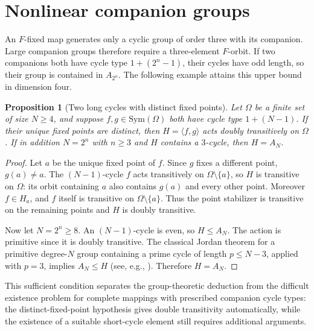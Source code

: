 \documentclass[11pt]{article}
\newtheorem{proposition}[theorem]{Proposition}
\begin{document}
\section{Nonlinear companion groups}\label{sec:nonlinear}
An $F$-fixed map generates only a cyclic group of order three with its
companion. Large companion groups therefore require a three-element
$F$-orbit. If two companions both have cycle type $1+(2^n-1)$, their
cycles have odd length, so their group is contained in $A_{2^n}$.
The following example attains this upper bound in dimension four.

\begin{proposition}[Two long cycles with distinct fixed points]
\label{prop:long-cycle-double-transitive}
Let $\Omega$ be a finite set of size $N\ge4$, and suppose
$f,g\in\mathrm{Sym}(\Omega)$ both have cycle type $1+(N-1)$.
If their unique fixed points are distinct, then
$H=\langle f,g\rangle$ acts doubly transitively on $\Omega$.
If in addition $N=2^n$ with $n\ge3$ and $H$ contains a
$3$-cycle, then $H=A_N$.
\end{proposition}
\begin{proof}
Let $a$ be the unique fixed point of $f$.
Since $g$ fixes a different point, $g(a)\ne a$.
The $(N-1)$-cycle $f$ acts transitively on
$\Omega\setminus\{a\}$, so $H$ is transitive on $\Omega$:
its orbit containing $a$ also contains $g(a)$ and every other point.
Moreover $f\in H_a$, and $f$ itself is transitive on
$\Omega\setminus\{a\}$. Thus the point stabilizer is
transitive on the remaining points and $H$ is doubly transitive.

Now let $N=2^n\ge8$. An $(N-1)$-cycle is even, so
$H\le A_N$. The action is primitive since it is doubly
transitive. The classical Jordan theorem for a primitive
degree-$N$ group containing a prime cycle of length
$p\le N-3$, applied with $p=3$, implies $A_N\le H$
(see, e.g., \cite{DM}). Therefore $H=A_N$.
\end{proof}

This sufficient condition separates the group-theoretic deduction
from the difficult existence problem for complete mappings with
prescribed companion cycle types: the distinct-fixed-point hypothesis
gives double transitivity automatically, while the existence of a
suitable short-cycle element still requires additional arguments.
\end{document}
